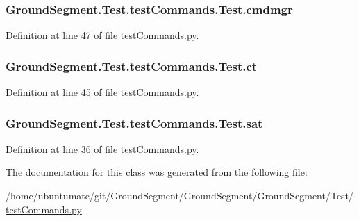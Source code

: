 \subsubsection[{cmdmgr}]{\setlength{\rightskip}{0pt plus 5cm}Ground\+Segment.\+Test.\+test\+Commands.\+Test.\+cmdmgr}\label{class_ground_segment_1_1_test_1_1test_commands_1_1_test_ae1c64dc16ec716e45c5ebd852d8c945b}


Definition at line 47 of file test\+Commands.\+py.

\hypertarget{class_ground_segment_1_1_test_1_1test_commands_1_1_test_ab34476cccb59a8732f7c3232dd2f52f5}{}
\subsubsection[{ct}]{\setlength{\rightskip}{0pt plus 5cm}Ground\+Segment.\+Test.\+test\+Commands.\+Test.\+ct}\label{class_ground_segment_1_1_test_1_1test_commands_1_1_test_ab34476cccb59a8732f7c3232dd2f52f5}


Definition at line 45 of file test\+Commands.\+py.

\hypertarget{class_ground_segment_1_1_test_1_1test_commands_1_1_test_a4fd3e359e08f1e19c6cc6057375becf9}{}
\subsubsection[{sat}]{\setlength{\rightskip}{0pt plus 5cm}Ground\+Segment.\+Test.\+test\+Commands.\+Test.\+sat}\label{class_ground_segment_1_1_test_1_1test_commands_1_1_test_a4fd3e359e08f1e19c6cc6057375becf9}


Definition at line 36 of file test\+Commands.\+py.



The documentation for this class was generated from the following file\+:\begin{DoxyCompactItemize}
\item 
/home/ubuntumate/git/\+Ground\+Segment/\+Ground\+Segment/\+Ground\+Segment/\+Test/\hyperlink{test_commands_8py}{test\+Commands.\+py}\end{DoxyCompactItemize}
